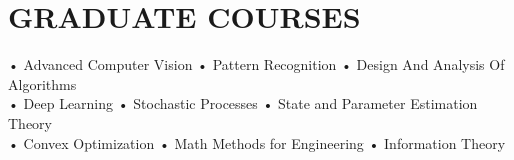 \documentclass[a4paper,7 pt]{article}
\begin{document}
\section{GRADUATE COURSES}
• Advanced Computer Vision  • Pattern Recognition   • Design And Analysis Of Algorithms \\
• Deep Learning    • Stochastic Processes  • State and Parameter Estimation Theory \\
• Convex Optimization    • Math Methods for Engineering  • Information Theory



\printbibliography[heading=none]





\vfill
\end{document}
